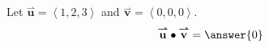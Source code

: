 \documentclass{ximera}
\author{Gregory Hartman \and Matthew Carr}
\begin{document}
\begin{exercise}
Let $\overset{\boldsymbol{\rightharpoonup}}{\mathbf{u}} = \left< 1,2,3 \right>$ and $\overset{\boldsymbol{\rightharpoonup}}{\mathbf{v}} = \left< 0,0,0 \right>$.
\[
\overset{\boldsymbol{\rightharpoonup}}{\mathbf{u}} \bullet \overset{\boldsymbol{\rightharpoonup}}{\mathbf{v}} = \answer{0}
\]
\end{exercise}
\end{document}
